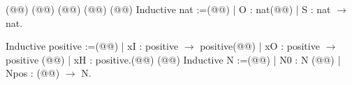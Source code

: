 (@\vspace{-0.04cm}@)
(@\vspace{-0.04cm}@)
(@\vspace{-0.04cm}@)
(@\vspace{-0.04cm}@)
(@\vspace{-0.14cm}@)
Inductive nat :=(@\vspace{-0.04cm}@)
| O : nat(@\vspace{-0.04cm}@)
| S : nat $\rightarrow$ nat.

Inductive positive :=(@\vspace{-0.04cm}@)
| xI : positive  $\rightarrow$ positive(@\vspace{-0.04cm}@)
| xO : positive  $\rightarrow$ positive (@\vspace{-0.04cm}@)
| xH : positive.(@\vspace{-0.04cm}@)
(@\vspace{-0.14cm}@)
Inductive N :=(@\vspace{-0.04cm}@)
| N0 : N (@\vspace{-0.04cm}@)
| Npos : (@@) $\rightarrow$ N.
